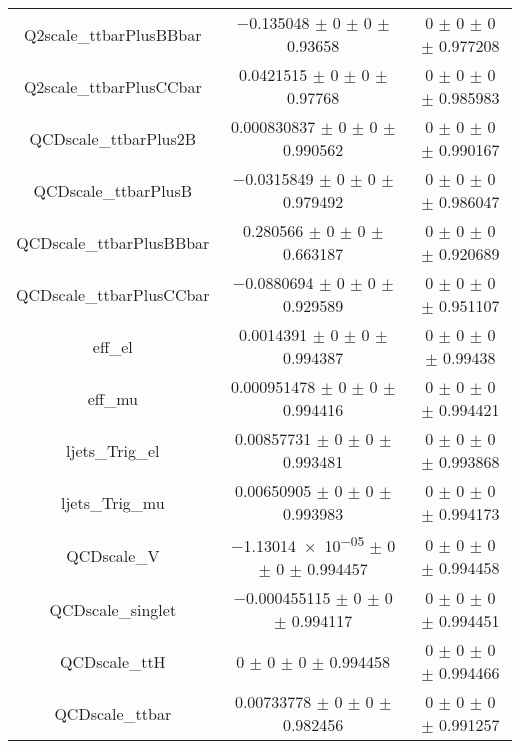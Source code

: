 \begin{table}
\begin{tabular}{ccc}
Q2scale\_ttbarPlusBBbar & \num{-0.135048} $\pm$ \num{0} $\pm$ \num{0} $\pm$ \num{0.93658} & \num{0} $\pm$ \num{0} $\pm$ \num{0} $\pm$ \num{0.977208}\\
Q2scale\_ttbarPlusCCbar & \num{0.0421515} $\pm$ \num{0} $\pm$ \num{0} $\pm$ \num{0.97768} & \num{0} $\pm$ \num{0} $\pm$ \num{0} $\pm$ \num{0.985983}\\
QCDscale\_ttbarPlus2B & \num{0.000830837} $\pm$ \num{0} $\pm$ \num{0} $\pm$ \num{0.990562} & \num{0} $\pm$ \num{0} $\pm$ \num{0} $\pm$ \num{0.990167}\\
QCDscale\_ttbarPlusB & \num{-0.0315849} $\pm$ \num{0} $\pm$ \num{0} $\pm$ \num{0.979492} & \num{0} $\pm$ \num{0} $\pm$ \num{0} $\pm$ \num{0.986047}\\
QCDscale\_ttbarPlusBBbar & \num{0.280566} $\pm$ \num{0} $\pm$ \num{0} $\pm$ \num{0.663187} & \num{0} $\pm$ \num{0} $\pm$ \num{0} $\pm$ \num{0.920689}\\
QCDscale\_ttbarPlusCCbar & \num{-0.0880694} $\pm$ \num{0} $\pm$ \num{0} $\pm$ \num{0.929589} & \num{0} $\pm$ \num{0} $\pm$ \num{0} $\pm$ \num{0.951107}\\
eff\_el & \num{0.0014391} $\pm$ \num{0} $\pm$ \num{0} $\pm$ \num{0.994387} & \num{0} $\pm$ \num{0} $\pm$ \num{0} $\pm$ \num{0.99438}\\
eff\_mu & \num{0.000951478} $\pm$ \num{0} $\pm$ \num{0} $\pm$ \num{0.994416} & \num{0} $\pm$ \num{0} $\pm$ \num{0} $\pm$ \num{0.994421}\\
ljets\_Trig\_el & \num{0.00857731} $\pm$ \num{0} $\pm$ \num{0} $\pm$ \num{0.993481} & \num{0} $\pm$ \num{0} $\pm$ \num{0} $\pm$ \num{0.993868}\\
ljets\_Trig\_mu & \num{0.00650905} $\pm$ \num{0} $\pm$ \num{0} $\pm$ \num{0.993983} & \num{0} $\pm$ \num{0} $\pm$ \num{0} $\pm$ \num{0.994173}\\
QCDscale\_V & \num{-1.13014e-05} $\pm$ \num{0} $\pm$ \num{0} $\pm$ \num{0.994457} & \num{0} $\pm$ \num{0} $\pm$ \num{0} $\pm$ \num{0.994458}\\
QCDscale\_singlet & \num{-0.000455115} $\pm$ \num{0} $\pm$ \num{0} $\pm$ \num{0.994117} & \num{0} $\pm$ \num{0} $\pm$ \num{0} $\pm$ \num{0.994451}\\
QCDscale\_ttH & \num{0} $\pm$ \num{0} $\pm$ \num{0} $\pm$ \num{0.994458} & \num{0} $\pm$ \num{0} $\pm$ \num{0} $\pm$ \num{0.994466}\\
QCDscale\_ttbar & \num{0.00733778} $\pm$ \num{0} $\pm$ \num{0} $\pm$ \num{0.982456} & \num{0} $\pm$ \num{0} $\pm$ \num{0} $\pm$ \num{0.991257}\\

\end{tabular}
\end{table}
